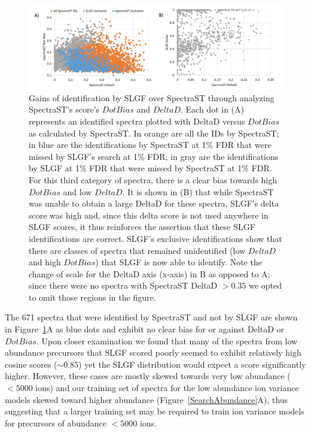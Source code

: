 \documentclass[endnotes,11pt]{article}
\begin{document}
\begin{figure}[!h]
 \centering
	\includegraphics[scale=.55]{DotBiasVsDeltaD2.pdf}
	\vspace{-0.3in}
  \caption{ Gains of identification by SLGF over SpectraST through analyzing SpectraST's score's $DotBias$ and $DeltaD$. Each dot in (A) represents an identified spectra plotted with DeltaD versus $DotBias$ as calculated by SpectraST. In orange are all the IDs by SpectraST; in blue are the identifications by SpectraST at 1\% FDR that were missed by SLGF's search at 1\% FDR; in gray are the identifications by SLGF at 1\% FDR that were missed by SpectraST at 1\% FDR. For this third category of spectra, there is a clear bias towards high $DotBias$ and low $DeltaD$. It is shown in (B) that while SpectraST was unable to obtain a large DeltaD for these spectra, SLGF's delta score was high and, since this delta score is not used anywhere in SLGF scores, it thus reinforces the assertion that these SLGF identifications are correct. SLGF's exclusive identifications show that there are classes of spectra that remained unidentified (low $DeltaD$ and high $DotBias$) that SLGF is now able to identify. Note the change of scale for the DeltaD axis (x-axis) in B as opposed to A; since there were no spectra with SpectraST DeltaD $>0.35$ we opted to omit those regions in the figure. }
	\label{SLGFDeltaDotBias}
\end{figure}


The 671 spectra that were identified by SpectraST and not by SLGF are shown in Figure~\ref{SLGFDeltaDotBias}A as blue dots and exhibit no clear bias for or against DeltaD or $DotBias$. Upon closer examination we found that many of the spectra from low abundance precursors that SLGF scored poorly seemed to exhibit relatively high cosine scores ($\sim0.85$) yet the SLGF distribution would expect a score significantly higher. However, these cases are mostly skewed towards very low abundance ($<5000$ ions) and our training set of spectra for the low abundance ion variance models skewed toward higher abundance (Figure~\ref{SearchAbundance}A), thus suggesting that a larger training set may be required to train ion variance models for precursors of abundance $<5000$ ions.
\end{document}
